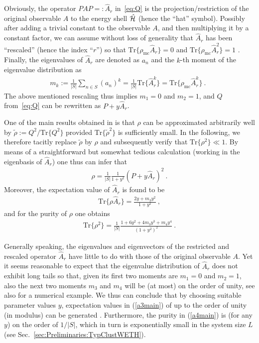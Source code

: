 \documentclass[twocolumn,aps,prb,floatfix,superscriptaddress]{revtex4-2}
\newcommand{\<}{\left\langle}	%
\renewcommand{\>}{\right\rangle}	%
\newcommand{\tr}{\mbox{Tr}}
\newcommand{\hr}{{\cal H}}
\newcommand{\rhomic}{\rho_{\mathrm{mc}}}
\begin{document}
Obviously, the
operator $PAP=:\hat A_r$ in~\eqref{eq:Q} is the projection/restriction 
of the original observable $A$ to the energy shell $\hat \hr$ (hence the ``hat'' symbol).
Possibly after adding a trivial constant to the observable $A$, and then 
multiplying it by a constant factor, we can 
assume without loss of generality that
$\hat A_r$ has been ``rescaled'' (hence the index ``$r$'') so that
$\tr\{\rhomic \hat A_r\}=0$ and $\tr\{\rhomic \hat A_r^2\}=1$ \cite{bar09}.
Finally, the eigenvalues of $\hat A_r$ are denoted 
as $a_n$ and the $k$-th moment 
of the eigenvalue distribution as
\begin{eqnarray}
m_k:=\frac{1}{|S|}\sum_{n\in S} (a_n)^k=\frac{1}{|S|}\tr\{\hat A_r^k\}=\tr\{\rhomic \hat A_r^k\}
\ . \ \
\label{a1}
\end{eqnarray}
The above mentioned rescaling thus implies
$m_1=0$ and $m_2=1$, and
$Q$ from~\eqref{eq:Q} can be rewritten as $P+y\hat A_r$.

One of the main results obtained in \cite{rei20} is 
that $\rho$ can be approximated arbitrarily well by
$\tilde \rho:=Q^2/\tr\{Q^2\}$ provided 
$\tr\{\tilde \rho^2\}$ is sufficiently small.
In the following, we therefore tacitly replace $\tilde\rho$ by $\rho$
and subsequently verify that $\tr\{\rho^2\}\ll 1$.
By means of a straightforward but somewhat tedious
calculation (working in the eigenbasis of $\hat A_r$)
one thus can infer that
\begin{eqnarray}
\rho = \frac{1}{|S|}\frac{1}{1+y^2}(P+y\hat A_r)^2
\ .
\label{a2}
\end{eqnarray}
Moreover, the expectation value of $\hat A_r$ is found to be
\begin{eqnarray}
\tr\{\rho \hat A_r\} = \frac{2y+m_3 y^2}{1+y^2}
\ ,
\label{a3main}
\end{eqnarray}
and for the purity of $\rho$ one obtains
\begin{eqnarray}
\tr\{\rho^2\} = \frac{1}{|S|} \frac{1+6y^2+4m_3y^3+m_4y^4}{(1+y^2)^2}
\ .
\label{a4main}
\end{eqnarray}

Generally speaking, the eigenvalues and eigenvectors
of the restricted and rescaled operator $\hat A_r$ 
have little to do with those of the original observable 
$A$.
Yet it seems reasonable to expect that
the eigenvalue distribution of $\hat A_r$  does not exhibit 
long tails so that, given its first two moments 
are $m_1=0$ and $m_2=1$,
also the next two moments $m_3$ and $m_4$
will be (at most) on the order of unity,
see also \cite{ric20} 
for a numerical example.
We thus can conclude that by choosing suitable 
parameter values $y$,
expectation values in (\ref{a3main}) of up to the order of 
unity (in modulus) can be generated \cite{bar09}.
Furthermore, the purity in (\ref{a4main}) is (for any $y$)
on the order of $1/|S|$, which in turn is
exponentially small in the system size $L$ 
(see
Sec.~\ref{sec:Preliminaries:TypClustWETH}).
\end{document}
